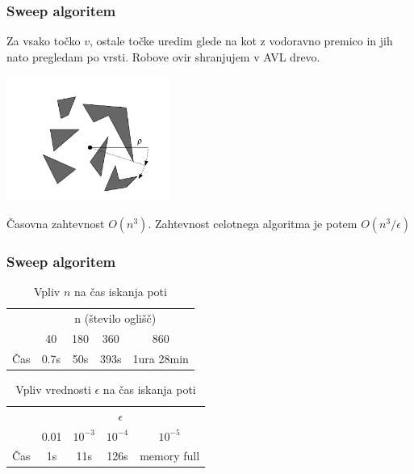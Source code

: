 \documentclass{beamer}
\begin{document}
\begin{frame}
    \frametitle{Sweep algoritem}
    
    Za vsako točko $v$, ostale točke uredim glede na kot z vodoravno premico in jih nato pregledam po vrsti. Robove ovir shranjujem v AVL drevo.

    \pause

    \includegraphics[width=0.4\textwidth]{sweep.png}

    \pause

    Časovna zahtevnost $O(n^3)$. Zahtevnost celotnega algoritma je potem  $O(n^3/\epsilon)$

    
\end{frame}

\begin{frame}
    \frametitle{Sweep algoritem}
    \begin{table}[h]
        \centering
        \begin{tabular}{|c|c|c|c|c|}
            \hline
            & \multicolumn{4}{c|}{n (število oglišč)} \\
            \cline{2-5}
            & 40 & 180 & 360 & 860 \\
            \hline
            Čas & 0.7s & 50s &  393s &  1ura 28min\\
            \hline
        \end{tabular}
        \caption{Vpliv $n$ na čas iskanja poti}

    \end{table}
   
    \begin{table}[h]
        \centering
        \begin{tabular}{|c|c|c|c|c|}
            \hline
            & \multicolumn{4}{c|}{$\epsilon$} \\
            \cline{2-5}
            & 0.01 & $10^{-3}$ & $10^{-4}$ & $10^{-5}$ \\
            \hline
            Čas & 1s & 11s & 126s  &  memory full \\
            \hline
           
        \end{tabular}
        \caption{Vpliv vrednosti $\epsilon$ na čas iskanja poti}
    \end{table}
\end{frame}
\end{document}
